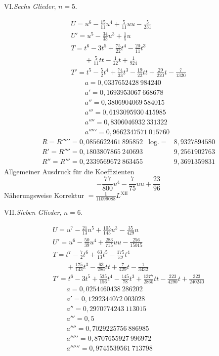\clearpage\begin{center}VI.\quad\textit{Sechs Glieder}, \(n=5\).\end{center}
\[
\begin{array}{l}
U=u^6-\frac{15}{11}u^4+\frac{5}{11}uu-\frac{5}{231}\\
U'=u^5-\frac{34}{33}u^3+\frac{1}{5}u\\
T=t^6-3t^5+\frac{75}{22}t^4-\frac{20}{11}t^3\\\qquad+\frac{5}{11}tt-\frac{1}{22}t+\frac{1}{924}\\
T'=t^5-\frac{5}{2}t^4+\frac{74}{33}t^3-\frac{19}{22}tt+\frac{29}{220}t-\frac{7}{1320}\\
\qquad a=0{,}0337652428\ 984240\\
\qquad a'=0{,}1693953067\ 668678\\
\qquad a''=0{,}3806904069\ 584015\\
\qquad a'''=0{,}6193095930\ 415985\\
\qquad a''''=0{,}8306046932\ 331322\\
\qquad a'''''=0{,}9662347571\ 015760
\end{array}
\]
\[
\begin{array}{lll}
R=R'''''=0{,}0856622461\ 895852&\mathrm{log.}=&8{,}9327894580\\
R'=R''''=0{,}1803807865\ 240693&&9{,}2561902763\\
R''=R'''=0{,}2339569672\ 863455&&9{,}3691359831
\end{array}
\]
\noindent Allgemeiner Ausdruck für die Koeffizienten
\[
-\frac{77}{800}u^4-\frac{7}{75}uu+\frac{23}{96}
\]
\noindent Näherungsweise Korrektur \(=\frac{1}{11099088}L^{\mathrm{XII}}\)
\endgroup
{}
\begingroup\renewcommand{\arraystretch}{1.6}
\clearpage\begin{center}VII.\quad\textit{Sieben Glieder}, \(n=6\).\end{center}
\[
\begin{array}{l}
U=u^7-\frac{21}{13}u^5+\frac{105}{143}u^3-\frac{35}{429}u\\
U'=u^6-\frac{50}{39}u^4+\frac{283}{715}uu-\frac{256}{15015}\\
T=t^7-\frac{7}{2}t^6+\frac{63}{13}t^5-\frac{175}{52}t^4\\\qquad+\frac{175}{143}t^3-\frac{63}{286}tt+\frac{7}{429}t-\frac{1}{3432}\\
T'=t^6-3t^5+\frac{535}{156}t^4-\frac{145}{78}t^3+\frac{1377}{2860}tt-\frac{223}{4290}t+\frac{323}{240240}\\
\qquad a=0{,}0254460438\ 286202\\
\qquad a'=0{,}1292344072\ 003028\\
\qquad a''=0{,}2970774243\ 113015\\
\qquad a'''=0{,}5\\
\qquad a''''=0{,}7029225756\ 886985\\
\qquad a'''''=0{,}8707655927\ 996972\\
\qquad a''''''=0{,}9745539561\ 713798
\end{array}
\]
